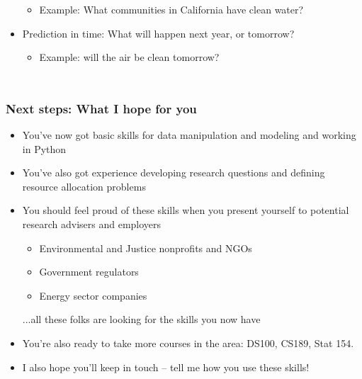 \documentclass[mathserif, aspectratio=169]{beamer}
\begin{document}
\begin{frame}
\begin{columns}[c]
\begin{itemize}
				\begin{itemize}
					\item Example: What communities in California have clean water?
				\end{itemize}
				\item Prediction in time: What will happen next year, or tomorrow?  
				\begin{itemize}
					\item Example: will the air be clean tomorrow?
				\end{itemize}
			\end{itemize}
	\end{columns}
\end{frame}

\begin{frame}
	\frametitle{Next steps: What I hope for you}
	\begin{itemize}
		\item You've now got basic skills for data manipulation and modeling and working in Python
		\item You've also got experience developing research questions and defining resource allocation problems
		\item You should feel proud of these skills when you present yourself to potential research advisers and employers
		\begin{itemize}
			\item Environmental and Justice nonprofits and NGOs
			\item Government regulators
			\item Energy sector companies
		\end{itemize}
		...all these folks are looking for the skills you now have
		\item You're also ready to take more courses in the area: DS100, CS189, Stat 154.
		\item I also hope you'll keep in touch -- tell me how you use these skills!
	\end{itemize}
\end{frame}
\end{document}
